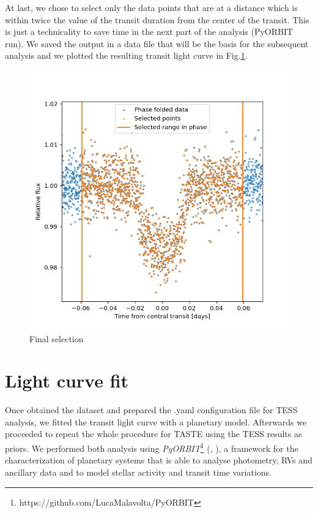 \documentclass{aa}
\begin{document}
At last, we chose to select only the data points that are at a distance which is within twice the value of the transit duration from the center of the transit. This is just a technicality to save time in the next part of the analysis (PyORBIT run). We saved the output in a data file that will be the basis for the subsequent analysis and we plotted the resulting transit light curve in Fig.\ref{fig:final}.
\begin{figure}[h]
  \centering
    \includegraphics[scale=0.25, angle=0]{pictures/final.png}
    \caption{Final selection}
    \label{fig:final}
\end{figure}

\section{Light curve fit}

Once obtained the dataset and prepared the .yaml configuration file for TESS analysis,
we fitted the transit light curve with a planetary model. Afterwards we proceeded to repeat the whole procedure for TASTE using the TESS results as priors.
We performed both analysis using \textit{PyORBIT}\footnote{https://github.com/LucaMalavolta/PyORBIT} 
(\cite{Malavolta16}, \cite{Malavolta18}), a framework for the characterization of planetary systems that is able to analyse photometry, 
RVs and ancillary data and to model stellar activity and transit time 
variations.
\end{document}
